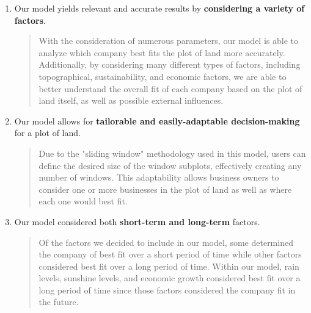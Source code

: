 \documentclass{mcmthesis}
\begin{document}
\begin{enumerate}
  \item Our model yields relevant and accurate results by \textbf{considering a variety of factors}.
    \begin{quote}
         With the consideration of numerous parameters, our model is able to analyze which company best fits the plot of land more accurately. Additionally, by considering many different types of factors, including topographical, sustainability, and economic factors, we are able to better understand the overall fit of each company based on the plot of land itself, as well as possible external influences.
    \end{quote}
 \item Our model allows for \textbf{tailorable and easily-adaptable decision-making} for a plot of land. 
     \begin{quote}
       Due to the "sliding window" methodology used in this model, users can define the desired size of the window subplots, effectively creating any number of windows. This adaptability allows business owners to consider one or more businesses in the plot of land as well as where each one would best fit.
    \end{quote}
 \item Our model considered both \textbf{short-term and long-term} factors.
    \begin{quote}
        Of the factors we decided to include in our model, some determined the company of best fit over a short period of time while other factors considered best fit over a long period of time. Within our model, rain levels, sunshine levels, and economic growth considered best fit over a long period of time since those factors considered the company fit in the future.
    \end{quote}
\end{enumerate}
\end{document}
